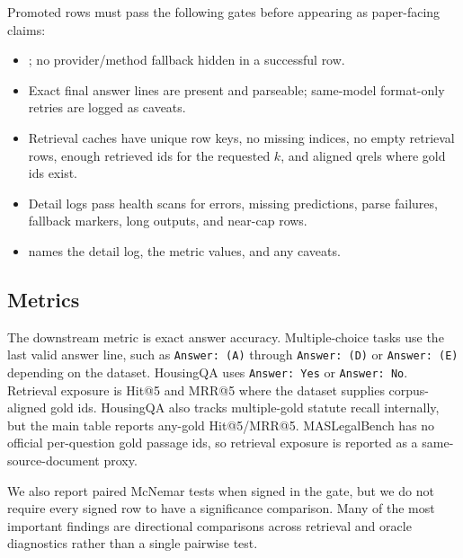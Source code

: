 Promoted rows must pass the following gates before appearing as paper-facing
claims:

\begin{itemize}[leftmargin=*]
\item {}; no provider/method fallback hidden in a
successful row.
\item Exact final answer lines are present and parseable; same-model
format-only retries are logged as caveats.
\item Retrieval caches have unique row keys, no missing indices, no empty
retrieval rows, enough retrieved ids for the requested $k$, and aligned qrels
where gold ids exist.
\item Detail logs pass health scans for errors, missing predictions, parse
failures, fallback markers, long outputs, and near-cap rows.
\item \claimgate names the detail log, the metric values, and any caveats.
\end{itemize}

\subsection{Metrics}

The downstream metric is exact answer accuracy. Multiple-choice tasks use the
last valid answer line, such as \texttt{Answer: (A)} through
\texttt{Answer: (D)} or \texttt{Answer: (E)} depending on the dataset. HousingQA uses
\texttt{Answer: Yes} or \texttt{Answer: No}. Retrieval exposure is Hit@5 and
MRR@5 where the dataset supplies corpus-aligned gold ids. HousingQA also tracks
multiple-gold statute recall internally, but the main table reports any-gold
Hit@5/MRR@5. MASLegalBench has no official per-question gold passage ids, so
retrieval exposure is reported as a same-source-document proxy.

We also report paired McNemar tests when signed in the gate, but we do not
require every signed row to have a significance comparison. Many of the most
important findings are directional comparisons across retrieval and oracle
diagnostics rather than a single pairwise test.
